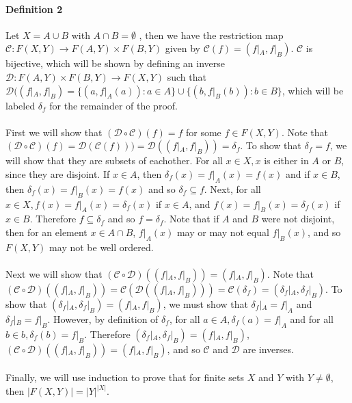 \documentclass[12pt, letterpaper]{article}
\begin{document}
\paragraph{Definition 2} Let \(X = A \cup B\) with \(A \cap B = \emptyset\) , then we have the restriction map \(\mathcal{C}: F(X,Y) \rightarrow F(A,Y) \times F(B,Y)\) given by \(\mathcal{C}(f) = (f|_A, f|_B)\). \(\mathcal{C}\) is bijective, which will be shown by defining an inverse \(\mathcal{D}: F(A,Y) \times F(B,Y) \rightarrow F(X,Y)\) such that \(\mathcal{D}((f|_A, f|_B) = \{(a, f|_A(a)) : a \in A \} \cup \{(b, f|_B(b)) : b \in B \}\), which will be labeled \(\delta_f\) for the remainder of the proof. 
\\\\
 First we will show that \((\mathcal{D} \circ \mathcal{C})(f) = f\) for some \(f \in F(X, Y)\). 
Note that \((\mathcal{D} \circ \mathcal{C})(f) = \mathcal{D}(\mathcal{C}(f))) = \mathcal{D}((f|_A, f|_B)) = \delta_f\). To show that \(\delta_f = f\), we will show that they are subsets of eachother. For all \(x \in X, x\) is either in \(A\) or \(B\), since they are disjoint. If \(x \in A\), then \(\delta_f(x) = f|_A(x) = f(x)\) and if \( x \in B\), then \(\delta_f(x) = f|_B(x) = f(x)\) and so \(\delta_f \subseteq f\). Next, for all \(x \in X, f(x) = f|_A(x) = \delta_f(x)\) if \(x \in A\), and \( f(x) = f|_B(x) = \delta_f(x)\) if \(x \in B\). Therefore \(f \subseteq \delta_f\) and so \(f = \delta_f\). Note that if \(A\) and \(B\) were not disjoint, then for an element \(x \in A \cap B\),  \(f|_A(x) \) may or may not equal \(f|_B(x)\), and so \(F(X,Y)\) may not be well ordered.
\\\\
Next we will show that \((\mathcal{C} \circ \mathcal{D})((f|_A, f|_B)) = (f|_A, f|_B)\). Note that  \((\mathcal{C} \circ \mathcal{D})((f|_A, f|_B)) =\mathcal{C}(\mathcal{D}((f|_A, f|_B))) =\mathcal{C}(\delta_f) = (\delta_f|_A, \delta_f|_B)\). To show that \((\delta_f|_A, \delta_f|_B) = (f|_A, f|_B)\), we must show that  \(\delta_f|_A = f|_A\) and \(\delta_f|_B = f|_B\). However, by definition of \(\delta_f\), for all \(a \in A, \delta_f(a) = f|_A\) and for all \(b \in b, \delta_f(b) = f|_B\). Therefore \((\delta_f|_A, \delta_f|_B) = (f|_A, f|_B)\),  \((\mathcal{C} \circ \mathcal{D})((f|_A, f|_B)) = (f|_A, f|_B)\), and so \(\mathcal{C}\) and \(\mathcal{D}\) are inverses.
\\\\
Finally, we will use induction to prove that for finite sets \(X\) and \(Y\) with \(Y \neq \emptyset\), then \(|F(X,Y)| = |Y|^{|X|}\).
\end{document}
